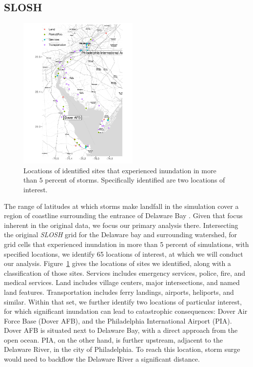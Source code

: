 \subsection{SLOSH}

\begin{figure}[ht]
    \caption{Locations of identified sites that experienced inundation in more than 
        $5$ percent of storms.  Specifically identified are two locations of 
        interest.  \label{map:delawarebay}}
    \centering
    \includegraphics[height=3in]{./plots/delaware}
\end{figure}

The range of latitudes at which storms make landfall in the simulation cover a region of
    coastline surrounding the entrance of Delaware Bay .  Given that focus inherent in the original data, we focus our primary analysis there.
    Intersecting the original \emph{SLOSH} grid for the Delaware bay and surrounding watershed, 
    for grid cells that experienced inundation in more than 5 percent of simulations, 
    with specified locations, we identify 65 locations of interest, at which we will conduct 
    our analysis.  Figure~\ref{map:delawarebay} gives the locations of sites we identified, along
    with a classification of those sites.  Services includes emergency services, police, fire,
    and medical services.  Land includes village centers, major intersections, and named
    land features.  Transportation includes ferry landings, airports, heliports, and similar.
    Within that set, we further identify two locations of particular interest, 
    for which significant inundation can lead to catastrophic consequences:  
    Dover Air Force Base (Dover AFB), and the Philadelphia International 
    Airport (PIA). Dover AFB is situated next to Delaware Bay, with a direct approach from the
    open ocean.  PIA, on the other hand, is further upstream, adjacent to the Delaware River, 
    in the city of Philadelphia.  To reach this location, storm surge would need to backflow 
    the Delaware River a significant distance.

